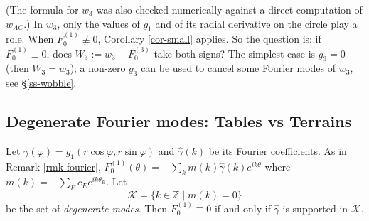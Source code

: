 \documentclass[a4paper,11pt,twoside,leqno]{article}
\newcommand{\zz}[0]{\ensuremath{\mathbb{Z}}}
\numberwithin{equation}{section}
\begin{document}
(The formula for $w_3$ was also checked numerically against a direct computation of $w_{AC}$.) In $w_3$, only the values of $g_1$ and of its radial derivative on the circle play a role. When $F_0^{(1)} \not \equiv 0$, Corollary \ref{cor-small} applies. So the question is: if $F_0^{(1)} \equiv 0$, does $W_3 := w_3 + F_0^{(3)}$ take both signs? The simplest case is $g_3 = 0$ (then $W_3 = w_3$); a non-zero $g_3$ can be used to cancel some Fourier modes of $w_3$, see \S{}\ref{ss-wobble}.

\subsection{Degenerate Fourier modes: Tables vs Terrains}\label{ss-degen}

Let $\gamma(\varphi) = g_1(r\cos\varphi, r\sin \varphi)$ and $\hat \gamma(k)$ be its Fourier coefficients. As in Remark \ref{rmk-fourier}, $F^{(1)}_0(\theta) = - \sum_k m(k) \hat\gamma(k) e^{ik\theta}$ where $m(k) = - \sum_E c_E e^{ik\theta_E}$. Let
\[
\mathcal{K} = \{ k \in \zz \mid m(k) = 0 \}
\]
be the set of \emph{degenerate modes}. Then $F^{(1)}_0 \equiv 0$ if and only if $\hat \gamma$ is supported in $\mathcal{K}$.
\end{document}
